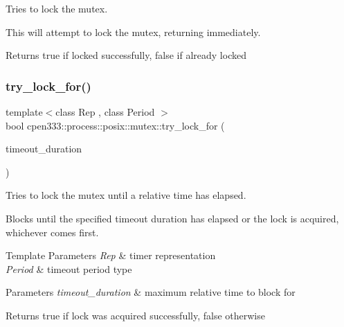 Tries to lock the mutex. 

This will attempt to lock the mutex, returning immediately.

\begin{DoxyReturn}{Returns}
true if locked successfully, false if already locked 
\end{DoxyReturn}
\mbox{\label{classcpen333_1_1process_1_1posix_1_1mutex_a28ac1db650efaae2d959df0e555f3d24}} 
\subsubsection{\texorpdfstring{try\+\_\+lock\+\_\+for()}{try\_lock\_for()}}
{\footnotesize\ttfamily template$<$class Rep , class Period $>$ \\
bool cpen333\+::process\+::posix\+::mutex\+::try\+\_\+lock\+\_\+for (\begin{DoxyParamCaption}\item[{const std\+::chrono\+::duration$<$ Rep, Period $>$ \&}]{timeout\+\_\+duration }\end{DoxyParamCaption})\hspace{0.3cm}{\ttfamily [inline]}}



Tries to lock the mutex until a relative time has elapsed. 

Blocks until the specified timeout duration has elapsed or the lock is acquired, whichever comes first.


\begin{DoxyTemplParams}{Template Parameters}
{\em Rep} & timer representation \\
\hline
{\em Period} & timeout period type \\
\hline
\end{DoxyTemplParams}

\begin{DoxyParams}{Parameters}
{\em timeout\+\_\+duration} & maximum relative time to block for \\
\hline
\end{DoxyParams}
\begin{DoxyReturn}{Returns}
true if lock was acquired successfully, false otherwise 
\end{DoxyReturn}
\mbox{\label{classcpen333_1_1process_1_1posix_1_1mutex_a0cfd76098d89d269ad4a89115e7673d1}} 
